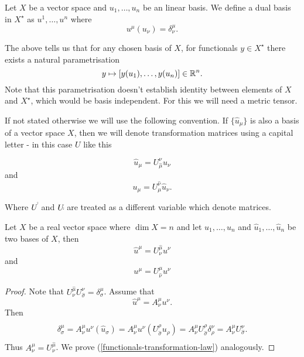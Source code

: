\documentclass[main.tex]{subfiles}
\begin{document}
\begin{definition}
Let $X$ be a vector space and $u_1, \dots, u_n$ be an linear basis. We define a dual basis in $X^\star$ as $u^1, \dots, u^n$ where
\begin{equation}
u^\mu(u_\nu) = \delta^\mu_\nu. 
\end{equation} 
\end{definition}

The above tells us that for any chosen basis of $X$, for functionals $y\in X^\star$ there exists a natural parametrisation 
\begin{equation}
y \mapsto [y(u_1), \dots, y(u_n)]\in \mathbb{R}^n. 
\end{equation}
Note that this parametrisation doesn't establish identity between elements of $X$ and $X^\star$, which would be basis independent. For this we will need a metric tensor.

If not stated otherwise we will use the following convention. If $\{\hat{u}_\mu\}$ is also a basis of a vector space $X$, then we will denote transformation matrices using a capital letter - in this case $U$ like this

\begin{equation}
\hat{u}_\mu = U^\nu_{\hat{\mu}} u_\nu
\end{equation}
and
\begin{equation}
u_\mu =  U^{\hat{\nu}}_\mu  \hat{u}_\nu.
\end{equation}

Where $U^{\hat{\dot}}$ and $U_{\hat{\dot}}$ are treated as a different variable which denote matrices.

\begin{theorem}
\label{basis-functional-basis-relation}
Let $X$ be a real vector space where $\dim X = n$ and let $u_1, \dots, u_n$ and $\hat{u}_1, \dots, \hat{u}_n$ be two bases of $X$, then
\begin{equation}
\hat{u}^\mu =  U^{\hat{\mu}}_{\nu} u^\nu
\end{equation}
and 
\begin{equation}
\label{functionals-transformation-law}
u^\mu = U^{\mu}_{\hat{\nu}} u^\nu
\end{equation}
\end{theorem}
\begin{proof}
Note that $U^{\hat{\mu}}_{\nu} U^{\nu}_{\hat{\sigma}} = \delta^\mu_\sigma$. Assume that 
\begin{equation}
\hat{u}^\mu = A^{\mu}_\nu u^\nu.
\end{equation}
Then
\begin{multline*}
\\
\delta^\mu_\sigma = A^\mu_\nu u^\nu(\hat{u}_\sigma) = A^\mu_\nu u^\nu(U^\rho_{\hat{\sigma}} u_\rho) = 
A^\mu_\nu U^\rho_{\hat{\sigma}} \delta^\nu_\rho = A^\mu_\nu U^\nu_{\hat{\sigma}}.
\\
\end{multline*}
Thus $A^\mu_\nu = U^{\hat{\mu}}_{\nu}$.
We prove (\ref{functionals-transformation-law}) analogously.
\end{proof}
\end{document}
